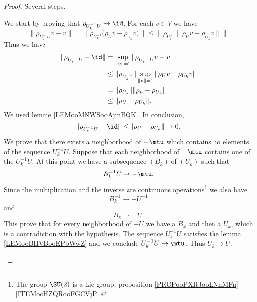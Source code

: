 \begin{proof}
	Several steps.
	\begin{subproof}
		\spitem[\( \rho_{U_k^{-1}U}\to\id\)]
		We start by proving that \( \rho_{U_k^{-1} U}\to \id\). For each \( v\in V\) we have
		\begin{equation}
			\| \rho_{U_k^{-1} U}v-v \|=\| \rho_{U_k^{-1}}\big( \rho_Uv-\rho_{U_k}v \big) \|\leq \| \rho_{U_k^{-1}}\| \rho_Uv-\rho_{U_k}v \| \|
		\end{equation}
		Thus we have
		\begin{subequations}
			\begin{align}
				\| \rho_{U_k^{-1}U}-\id \| & =\sup_{\| v \|=1}\| \rho_{U_k^{-1}U}v-v \|                          \\
				                           & \leq \| \rho_{U_k^{-1}} \|\sup_{\| v \|=1}\| \rho_Uv-\rho_{U_k}v \| \\
				                           & =\| \rho_{U_k} \|\| \rho_u-\rho_{U_k} \|                            \\
				                           & \leq \| \rho_U-\rho_{U_k} \|.
			\end{align}
		\end{subequations}
		We used lemme \ref{LEMooMNWSooAjmBQK}. In conclusion,
		\begin{equation}
			\| \rho_{U_k^{-1}U}-\id \|\leq \| \rho_U-\rho_{U_k} \|\to 0.
		\end{equation}
		We prove that there exists a neighborhood of \( -\mtu\) which contains no elements of the sequence \( U_k^{-1}U\). Suppose that each neighborhood of \( -\mtu\) contains one of the \( U_k^{-1}U\). At this point we have a subsequence \( (B_k)\) of \( (U_k)\) such that
		\begin{equation}
			B_k^{-1}U\to-\mtu.
		\end{equation}
		Since the multiplication and the inverse are continuous operations\footnote{The group \( \SU(2)\) is a Lie group, proposition \ref{PROPooPXRJooLNnMFn}\ref{ITEMooHZQRooFGCVjP}.} we also have
		\begin{equation}
			B_k^{-1}\to-U^{-1}
		\end{equation}
		and
		\begin{equation}
			B_k\to -U.
		\end{equation}
		This prove that for every neighborhood of \( -U\) we have a \( B_k\) and then a \( U_k\), which is a contradiction with the hypothesis.
		\spitem[Conclusion]
		The sequence \( U_k^{-1}U\) satisfies the lemma \ref{LEMooBHVBooEPbWwZ} and we conclude \( U_k^{-1}U\to \mtu\). Thus \( U_k\to U\).
	\end{subproof}
\end{proof}

